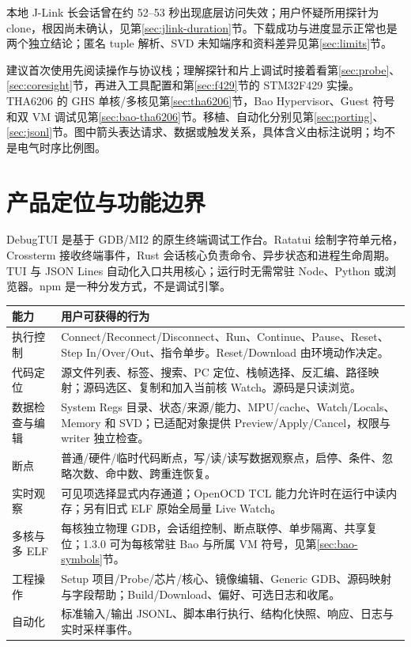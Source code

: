 \documentclass[UTF8,a4paper,11pt,oneside,fontset=none]{ctexart}
\newcommand{\notice}[1]{\par\noindent\colorbox{pale}{\parbox{\dimexpr\linewidth-2\fboxsep}{\small #1}}\par}
\begin{document}
\notice{本地 J-Link 长会话曾在约 52--53 秒出现底层访问失效；用户怀疑所用探针为 clone，根因尚未确认，见第\ref{sec:jlink-duration}节。下载成功与进度显示正常也是两个独立结论；匿名 tuple 解析、SVD 未知端序和资料差异见第\ref{sec:limits}节。}

建议首次使用先阅读操作与协议栈；理解探针和片上调试时接着看第\ref{sec:probe}、\ref{sec:coresight}节，再进入工具配置和第\ref{sec:f429}节的 STM32F429 实操。THA6206 的 GHS 单核/多核见第\ref{sec:tha6206}节，Bao Hypervisor、Guest 符号和双 VM 调试见第\ref{sec:bao-tha6206}节。移植、自动化分别见第\ref{sec:porting}、\ref{sec:jsonl}节。图中箭头表达请求、数据或触发关系，具体含义由标注说明；均不是电气时序比例图。
\clearpage{\fontsize{9}{10.5}\selectfont\setlength{\parskip}{0pt}\tableofcontents}
\clearpage{}

\section{产品定位与功能边界}
DebugTUI 是基于 GDB/MI2 的原生终端调试工作台。Ratatui 绘制字符单元格，Crossterm 接收终端事件，Rust 会话核心负责命令、异步状态和进程生命周期。TUI 与 JSON Lines 自动化入口共用核心；运行时无需常驻 Node、Python 或浏览器。npm 是一种分发方式，不是调试引擎。

\noindent\begin{tabularx}{\linewidth}{@{}P{28mm}Y@{}}\toprule
能力 & 用户可获得的行为\\\midrule
执行控制 & Connect/Reconnect/Disconnect、Run、Continue、Pause、Reset、Step In/Over/Out、指令单步。Reset/Download 由环境动作决定。\\
代码定位 & 源文件列表、标签、搜索、PC 定位、栈帧选择、反汇编、路径映射；源码选区、复制和加入当前核 Watch。源码是只读浏览。\\
数据检查与编辑 & System Regs 目录、状态/来源/能力、MPU/cache、Watch/Locals、Memory 和 SVD；已适配对象提供 Preview/Apply/Cancel，权限与 writer 独立检查。\\
断点 & 普通/硬件/临时代码断点，写/读/读写数据观察点，启停、条件、忽略次数、命中数、跨重连恢复。\\
实时观察 & 可见项选择显式内存通道；OpenOCD TCL 能力允许时在运行中读内存；另有旧式 ELF 原始全局量 Live Watch。\\
多核与多 ELF & 每核独立物理 GDB，会话组控制、断点联停、单步隔离、共享复位；1.3.0 可为每核常驻 Bao 与所属 VM 符号，见第\ref{sec:bao-symbols}节。\\
工程操作 & Setup 项目/Probe/芯片/核心、镜像编辑、Generic GDB、源码映射与字段帮助；Build/Download、偏好、可选日志和收尾。\\
自动化 & 标准输入/输出 JSONL、脚本串行执行、结构化快照、响应、日志与实时采样事件。\\\bottomrule
\end{tabularx}
\end{document}
